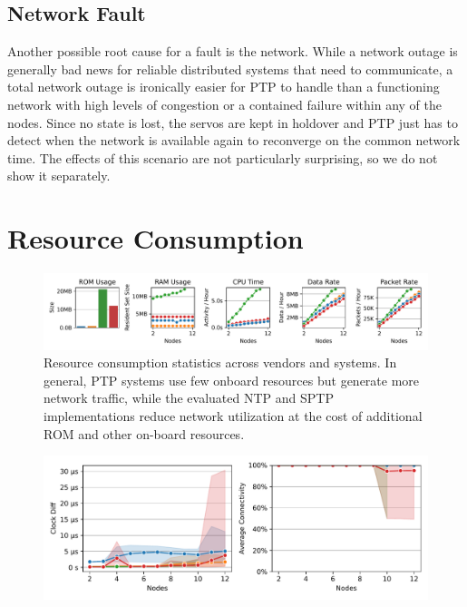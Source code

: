 \subsection{Network Fault}

Another possible root cause for a fault is the network. While a network outage is generally bad news for reliable distributed systems that need to communicate, a total network outage is ironically easier for PTP to handle than a functioning network with high levels of congestion or a contained failure within any of the nodes. Since no state is lost, the servos are kept in holdover and PTP just has to detect when the network is available again to reconverge on the common network time. The effects of this scenario are not particularly surprising, so we do not show it separately.


\section{Resource Consumption}
\label{sec:resource_consumption}

\begin{figure}
\centering
\includegraphics[width=\linewidth]{res/generated/resource_consumption/summary_trend.pdf}
\legend
\caption{Resource consumption statistics across vendors and systems. In general, PTP systems use few onboard resources but generate more network traffic, while the evaluated NTP and SPTP implementations reduce network utilization at the cost of additional ROM and other on-board resources.}
\label{fig:resource_consumption}
\end{figure}

\begin{figure}
\centering
\includegraphics[width=\linewidth]{res/generated/resource_consumption/summary_quality_trend.pdf}
\legend
\caption{}
\label{fig:resource_consumption_quality}
\end{figure}


